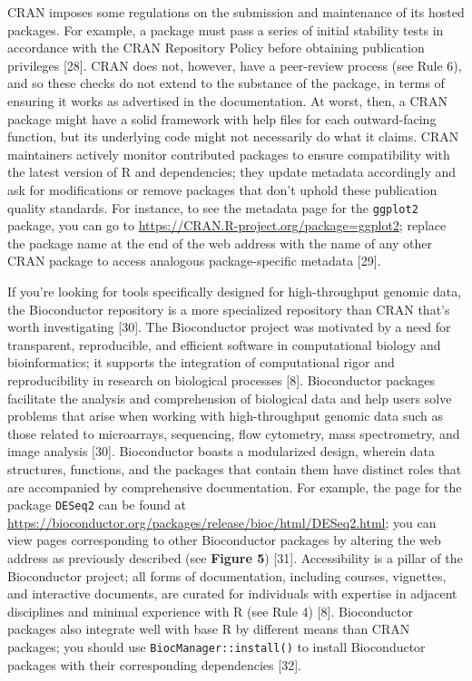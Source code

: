 \documentclass[10pt,letterpaper]{article}
\begin{document}
CRAN imposes some regulations on the submission and maintenance of its
hosted packages. For example, a package must pass a series of initial
stability tests in accordance with the CRAN Repository Policy before
obtaining publication privileges {[}28{]}. CRAN does not, however, have
a peer-review process (see Rule 6), and so these checks do not extend to
the substance of the package, in terms of ensuring it works as
advertised in the documentation. At worst, then, a CRAN package might
have a solid framework with help files for each outward-facing function,
but its underlying code might not necessarily do what it claims. CRAN
maintainers actively monitor contributed packages to ensure
compatibility with the latest version of R and dependencies; they update
metadata accordingly and ask for modifications or remove packages that
don't uphold these publication quality standards. For instance, to see
the metadata page for the \texttt{ggplot2} package, you can go to
\url{https://CRAN.R-project.org/package=ggplot2}; replace the package
name at the end of the web address with the name of any other CRAN
package to access analogous package-specific metadata {[}29{]}.

If you're looking for tools specifically designed for high-throughput
genomic data, the Bioconductor repository is a more specialized
repository than CRAN that's worth investigating {[}30{]}. The
Bioconductor project was motivated by a need for transparent,
reproducible, and efficient software in computational biology and
bioinformatics; it supports the integration of computational rigor and
reproducibility in research on biological processes {[}8{]}.
Bioconductor packages facilitate the analysis and comprehension of
biological data and help users solve problems that arise when working
with high-throughput genomic data such as those related to microarrays,
sequencing, flow cytometry, mass spectrometry, and image analysis
{[}30{]}. Bioconductor boasts a modularized design, wherein data
structures, functions, and the packages that contain them have distinct
roles that are accompanied by comprehensive documentation. For example,
the page for the package \texttt{DESeq2} can be found at
\url{https://bioconductor.org/packages/release/bioc/html/DESeq2.html};
you can view pages corresponding to other Bioconductor packages by
altering the web address as previously described (see \textbf{Figure 5})
{[}31{]}. Accessibility is a pillar of the Bioconductor project; all
forms of documentation, including courses, vignettes, and interactive
documents, are curated for individuals with expertise in adjacent
disciplines and minimal experience with R (see Rule 4) {[}8{]}.
Bioconductor packages also integrate well with base R by different means
than CRAN packages; you should use \texttt{BiocManager::install()} to
install Bioconductor packages with their corresponding dependencies
{[}32{]}.
\end{document}
